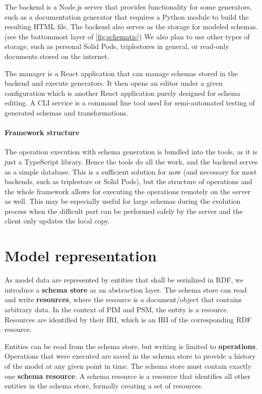 The backend is a Node.js server that provides functionality for some generators, such as a documentation generator that requires a Python module to build the resulting HTML file. The backend also serves as the storage for modeled schemas. (see the bottommost layer of \autoref{fig:schematic}) We also plan to use other types of storage, such as personal Solid Pods, triplestores in general, or read-only documents stored on the internet.

The manager is a React application that can manage schemas stored in the backend and execute generators. It then opens an editor under a given configuration which is another React application purely designed for schema editing. A CLI service is a command line tool used for semi-automated testing of generated schemas and transformations.

\paragraph{Framework structure} The operation execution with schema generation is bundled into the tools, as it is just a TypeScript library. Hence the tools do all the work, and the backend serves as a simple database. This is a sufficient solution for now (and necessary for most backends, such as triplestore or Solid Pods), but the structure of operations and the whole framework allows for executing the operations remotely on the server as well. This may be especially useful for large schemas during the evolution process when the difficult part can be performed safely by the server and the client only updates the local copy.

\section{Model representation} %

As model data are represented by entities that shall be serialized in RDF, we introduce a \textbf{schema store} as an abstraction layer. The schema store can read and write \textbf{resources}, where the resource is a document/object that contains arbitrary data. In the context of PIM and PSM, the entity is a resource. Resources are identified by their IRI, which is an IRI of the corresponding RDF resource.

Entities can be read from the schema store, but writing is limited to \textbf{operations}. Operations that were executed are saved in the schema store to provide a history of the model at any given point in time. The schema store must contain exactly one \textbf{schema resource}. A schema resource is a resource that identifies all other entities in the schema store, formally creating a set of resources.

